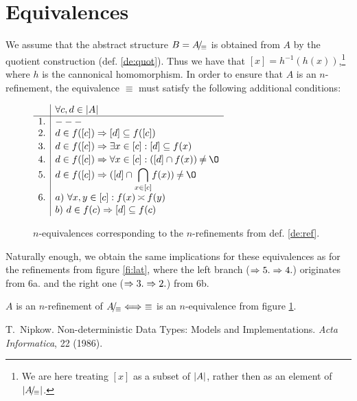 \section{Equivalences}
We assume that the abstract structure $B=A\!/\!_\equiv$ is obtained from $A$
by the quotient construction (def. \ref{de:quot}). Thus we have that
 $[x]=h^{-1}(h(x))$,\footnote{We are here treating $[x]$ as a subset of
 $|A|$, rather then as an element of $|A\!/\!_\equiv|$.}
 where $h$ is the cannonical homomorphism.
In order to ensure that $A$ is an $n$-refinement, the equivalence $\equiv$ must
 satisfy the following additional conditions:

\begin{figure}[hbt]
\hspace*{10em}$\begin{array}{r|l}
 & \forall c,d \in \carrier A \\
\hline
1. & ---  \\
2. & d \in f([c]) \impl [d] \subseteq f([c]) \\[.4ex]
3. & d \in f([c]) \impl \exists x\in [c] : [d]\subseteq f(x) \\[.4ex]
4. & d \in f([c]) \impl \forall x\in [c] : ([d]\cap f(x)) \Not= \es \\[.4ex]
5. & d \in f([c]) \impl  ([d] \cap {\displaystyle \bigcap_{x\in [c]}}f(x)) \Not= \es \\
6. & a)\ \forall x,y\in [c] : f(x) \Seteq f(y) \\[.2ex]
   & b)\ d \in f(c) \impl [d]\subseteq f(c)
\end{array}$
\caption{$n$-equivalences corresponding to the $n$-refinements from def. \ref{de:ref}.}\label{fi:equiv}
\end{figure}

\noindent
Naturally enough, we obtain the same implications for these equivalences as for the
refinements from figure \ref{fi:lat}, where the left branch ($\mathrel\Rightarrow 5. \mathrel\Rightarrow 4.$) 
 originates from 6a. and the right one ($\mathrel\Rightarrow 3. \mathrel\Rightarrow 2.$) from 6b.
%
\begin{CLAIM}
 $A$ is an $n$-refinement of $A\!/\!_\equiv \mathrel{\Longleftrightarrow}\ \equiv$ is an $n$-equivalence
 from figure \ref{fi:equiv}. 
\end{CLAIM}


\begin{thebibliography}{MeRef}\MyLPar
{} T.~Nipkow. Non-deterministic Data Types: Models and Implementations.
  {\em Acta Informatica}, 22 (1986).

\end{thebibliography}


